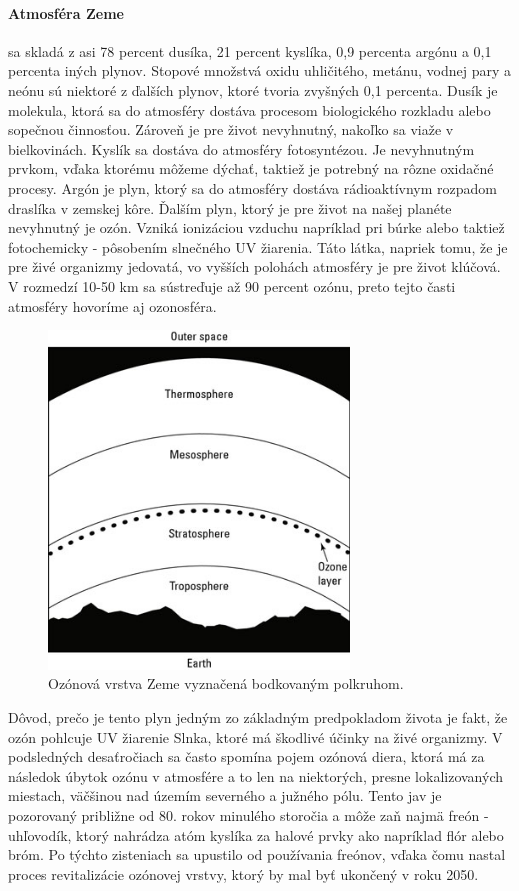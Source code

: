 \paragraph{Atmosféra Zeme} sa skladá z asi 78 percent dusíka, 21 percent kyslíka, 0,9 percenta argónu a 0,1 percenta iných plynov. Stopové množstvá oxidu uhličitého, metánu, vodnej pary a neónu sú niektoré z ďalších plynov, ktoré tvoria zvyšných 0,1 percenta. Dusík je molekula, ktorá sa do atmosféry dostáva procesom biologického rozkladu alebo sopečnou činnosťou. Zároveň je pre život nevyhnutný, nakoľko sa viaže v bielkovinách. Kyslík sa dostáva do atmosféry fotosyntézou. Je nevyhnutným prvkom, vďaka ktorému môžeme dýchať, taktiež je potrebný na rôzne oxidačné procesy. Argón je plyn, ktorý sa do atmosféry dostáva rádioaktívnym rozpadom draslíka v zemskej kôre. 
Ďalším plyn, ktorý je pre život na našej planéte nevyhnutný je ozón. Vzniká ionizáciou vzduchu napríklad pri búrke alebo taktiež fotochemicky - pôsobením slnečného UV žiarenia. Táto látka, napriek tomu, že je pre živé organizmy jedovatá, vo vyšších polohách atmosféry je pre život klúčová. V rozmedzí 10-50 km sa sústreďuje až 90 percent ozónu, preto tejto časti atmosféry hovoríme aj ozonosféra. 
\begin{figure}[!htbp]
  \centering
  \includegraphics[width=8cm]{img/ozone.jpg}
  \caption{Ozónová vrstva Zeme vyznačená bodkovaným polkruhom.}
  \label{numModel}
\end{figure}
\newline Dôvod, prečo je tento plyn jedným zo základným predpokladom života je fakt, že ozón pohlcuje UV žiarenie Slnka, ktoré má škodlivé účinky na živé organizmy. V podsledných desaťročiach sa často spomína pojem ozónová diera, ktorá má za následok úbytok ozónu v atmosfére a to len na niektorých, presne lokalizovaných miestach, väčšinou nad územím severného a južného pólu. Tento jav je pozorovaný približne od 80. rokov minulého storočia a môže zaň najmä freón - uhľovodík, ktorý nahrádza atóm kyslíka za halové prvky ako napríklad flór alebo bróm. Po týchto zisteniach sa upustilo od používania freónov, vďaka čomu nastal proces revitalizácie ozónovej vrstvy, ktorý by mal byť ukončený v roku 2050.

